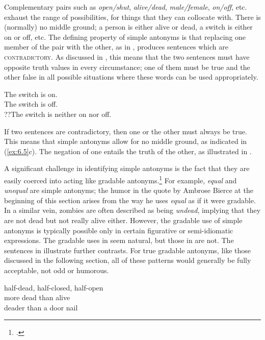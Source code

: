 Complementary pairs such as \textit{open/shut}, \textit{alive/dead}, \textit{male/female}, \textit{on/off}, etc. exhaust the range of possibilities, for things that they can collocate with. There is (normally) no middle ground; a person is either alive or dead, a switch is either on or off, etc. The defining property of simple antonyms is that replacing one member of the pair with the other, as in , produces sentences which are \textsc{contradictory.} As discussed in , this means that the two sentences must have opposite truth values in every circumstance; one of them must be true and the other false in all possible situations where these words can be used appropriately.


\ea \label{ex:6.5}
\ea The switch is on.\\
\ex The switch is off.\\
\ex ??The switch is neither on nor off.
                       \z
\z


If two sentences are contradictory, then one or the other must always be true. This means that simple antonyms allow for no middle ground, as indicated in (\ref{ex:6.5}c). The negation of one entails the truth of the other, as illustrated in .


\ea \label{ex:6.6}
                       \z
\z


A significant challenge in identifying simple antonyms is the fact that they are easily coerced into acting like gradable antonyms.\footnote{\citet[463]{Cann2011}.} For example, \textit{equal} and \textit{unequal} are simple antonyms; the humor in the quote by Ambrose Bierce at the beginning of this section arises from the way he uses \textit{equal} as if it were gradable. In a similar vein, zombies are often described as being \textit{undead}, implying that they are not dead but not really alive either. However, the gradable use of simple antonyms is typically possible only in certain figurative or semi-idiomatic expressions. The gradable uses in  seem natural, but those in  are not. The sentences in  illustrate further contrasts. For true gradable antonyms, like those discussed in the following section, all of these patterns would generally be fully acceptable, not odd or humorous.


\ea \label{ex:6.7}
\ea half-dead, half-closed, half-open\\
\ex more dead than alive\\
\ex deader than a door nail
                       \z
\z

